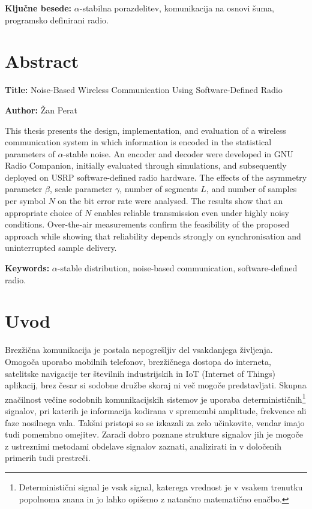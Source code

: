 \documentclass[a4paper, 12pt, openany]{book}
\newcommand{\ttitleEn}{Noise-Based Wireless Communication Using Software-Defined Radio}
\newcommand{\tauthor}{Žan Perat}
\newcommand{\tkeywords}{$\alpha$-stabilna porazdelitev, komunikacija na osnovi šuma, programsko definirani radio}
\newcommand{\tkeywordsEn}{$\alpha$-stable distribution, noise-based communication, software-defined radio}
\newcommand{\clearemptydoublepage}{\newpage{\pagestyle{empty}\cleardoublepage}}
\begin{document}
\bigskip

\noindent\textbf{Ključne besede:} \tkeywords.
\clearemptydoublepage

\chapter*{Abstract}

\noindent\textbf{Title:} \ttitleEn
\bigskip

\noindent\textbf{Author:} \tauthor
\bigskip

\noindent This thesis presents the design, implementation, and evaluation of a wireless communication system in which information is encoded in the statistical parameters of $\alpha$-stable noise. An encoder and decoder were developed in GNU Radio Companion, initially evaluated through simulations, and subsequently deployed on USRP software-defined radio hardware. The effects of the asymmetry parameter $\beta$, scale parameter $\gamma$, number of segments $L$, and number of samples per symbol $N$ on the bit error rate were analysed. The results show that an appropriate choice of $N$ enables reliable transmission even under highly noisy conditions. Over-the-air measurements confirm the feasibility of the proposed approach while showing that reliability depends strongly on synchronisation and uninterrupted sample delivery.
\bigskip

\noindent\textbf{Keywords:} \tkeywordsEn.
\clearemptydoublepage

\mainmatter
\setcounter{page}{1}
\pagestyle{fancy}

\chapter{Uvod}
Brezžična komunikacija je postala nepogrešljiv del vsakdanjega življenja. Omogoča uporabo mobilnih telefonov, brezžičnega dostopa do interneta, satelitske navigacije ter številnih industrijskih in IoT (Internet of Things) aplikacij, brez česar si sodobne družbe skoraj ni več mogoče predstavljati. Skupna značilnost večine sodobnih komunikacijskih sistemov je uporaba determinističnih\footnote{Deterministični signal je vsak signal, katerega vrednost je v vsakem trenutku popolnoma znana in jo lahko opišemo z natančno matematično enačbo.} signalov, pri katerih je informacija kodirana v spremembi amplitude, frekvence ali faze nosilnega vala. Takšni pristopi so se izkazali za zelo učinkovite, vendar imajo tudi pomembno omejitev. Zaradi dobro poznane strukture signalov jih je mogoče z ustreznimi metodami obdelave signalov zaznati, analizirati in v določenih primerih tudi prestreči. %
\end{document}
